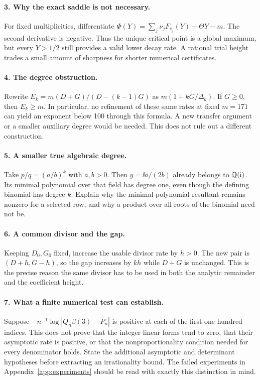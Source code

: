 \paragraph{3. Why the exact saddle is not necessary.}
For fixed multiplicities, differentiate
\(\Phi(Y)=\sum_j\nu_jF_{c_j}(Y)-\Theta Y-m\).
The second derivative is negative. Thus the unique critical
point is a global maximum, but every \(Y>1/2\) still provides
a valid lower decay rate. A rational trial height trades a small
amount of sharpness for shorter numerical certificates.

\paragraph{4. The degree obstruction.}
Rewrite \(E_k=m(D+G)/(D-(k-1)G)\) as
\(m(1+kG/\Delta_k)\). If \(G\ge0\), then \(E_k\ge m\).
In particular, no refinement of these same rates at fixed
\(m=171\) can yield an exponent below 100 through this formula.
A new transfer argument or a smaller auxiliary degree would be
needed. This does not rule out a different construction.

\paragraph{5. A smaller true algebraic degree.}
Take \(p/q=(a/b)^k\) with \(a,b>0\). Then
\(y=\ii a/(2b)\) already belongs to \(\mathbb Q(\mathrm{i})\).
Its minimal polynomial over that field has degree one, even
though the defining binomial has degree \(k\). Explain why the
minimal-polynomial resultant remains nonzero for a selected row,
and why a product over all roots of the binomial need not be.

\paragraph{6. A common divisor and the gap.}
Keeping \(D_0,G_0\) fixed, increase the usable divisor rate by
\(h>0\). The new pair is \((D+h,G-h)\), so the gap increases
by \(kh\) while \(D+G\) is unchanged. This is the precise
reason the same divisor has to be used in both the analytic
remainder and the coefficient height.

\paragraph{7. What a finite numerical test can establish.}
Suppose \(-n^{-1}\log|Q_n\beta(3)-P_n|\) is positive at
each of the first one hundred indices. This does not prove that
the integer linear forms tend to zero, that their asymptotic
rate is positive, or that the nonproportionality condition needed
for every denominator holds. State the additional asymptotic and
determinant hypotheses before extracting an irrationality bound.
The failed experiments in Appendix~\ref{app:experiments} should
be read with exactly this distinction in mind.
